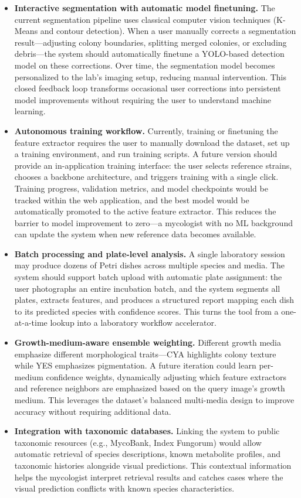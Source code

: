 \begin{itemize}
\item
  \textbf{Interactive segmentation with automatic model finetuning.} The current segmentation pipeline uses classical computer vision techniques (K-Means and contour detection). When a user manually corrects a segmentation result---adjusting colony boundaries, splitting merged colonies, or excluding debris---the system should automatically finetune a YOLO-based detection model on these corrections. Over time, the segmentation model becomes personalized to the lab's imaging setup, reducing manual intervention. This closed feedback loop transforms occasional user corrections into persistent model improvements without requiring the user to understand machine learning.
\item
  \textbf{Autonomous training workflow.} Currently, training or finetuning the feature extractor requires the user to manually download the dataset, set up a training environment, and run training scripts. A future version should provide an in-application training interface: the user selects reference strains, chooses a backbone architecture, and triggers training with a single click. Training progress, validation metrics, and model checkpoints would be tracked within the web application, and the best model would be automatically promoted to the active feature extractor. This reduces the barrier to model improvement to zero---a mycologist with no ML background can update the system when new reference data becomes available.
\item
  \textbf{Batch processing and plate-level analysis.} A single laboratory session may produce dozens of Petri dishes across multiple species and media. The system should support batch upload with automatic plate assignment: the user photographs an entire incubation batch, and the system segments all plates, extracts features, and produces a structured report mapping each dish to its predicted species with confidence scores. This turns the tool from a one-at-a-time lookup into a laboratory workflow accelerator.
\item
  \textbf{Growth-medium-aware ensemble weighting.} Different growth media emphasize different morphological traits---CYA highlights colony texture while YES emphasizes pigmentation. A future iteration could learn per-medium confidence weights, dynamically adjusting which feature extractors and reference neighbors are emphasized based on the query image's growth medium. This leverages the dataset's balanced multi-media design to improve accuracy without requiring additional data.
\item
  \textbf{Integration with taxonomic databases.} Linking the system to public taxonomic resources (e.g., MycoBank, Index Fungorum) would allow automatic retrieval of species descriptions, known metabolite profiles, and taxonomic histories alongside visual predictions. This contextual information helps the mycologist interpret retrieval results and catches cases where the visual prediction conflicts with known species characteristics.
\end{itemize}
